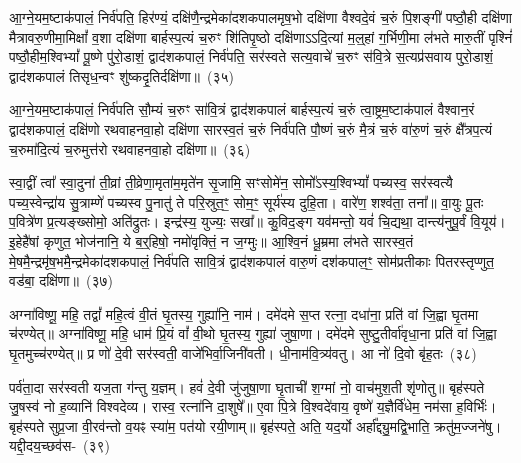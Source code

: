 {\anuvakamend[{वा॒र॒व॒न्तीयं॑ च॒त्वारि॑ च}]}%

आ॒ग्ने॒यम॒ष्टा\-क॑पालं॒ निर्व॑पति॒ हिर॑ण्यं॒ दक्षि॑णै॒न्द्रमेका॑\-दश\-कपालमृष॒भो दक्षि॑णा वैश्वदे॒वं च॒रुं पि॒शङ्गी॑ पष्ठौ॒ही दक्षि॑णा मैत्रावरु॒णीमा॒मिक्षां᳚ व॒शा दक्षि॑णा बार्\mbox{}हस्प॒त्यं च॒रुꣳ शि॑तिपृ॒ष्ठो दक्षि॑णा\-ऽ\-ऽदि॒त्यां म॒ल्॒\mbox{}हां ग॒र्भिणी॒मा ल॑भते मारु॒तीं पृश्निं॑ पष्ठौ॒हीम॒श्वि\-भ्यां᳚ पू॒ष्णे पु॑रो॒डाशं॒ द्वाद॑श\-कपालं॒ निर्व॑पति॒ सर॑स्वते सत्य॒वाचे॑ च॒रुꣳ स॑वि॒त्रे स॒त्यप्र॑सवाय पुरो॒डाशं॒ द्वाद॑श\-कपालं तिसृध॒न्वꣳ शु॑ष्कदृ॒तिर्दक्षि॑णा॥~(३५)

{\anuvakamend[{आ॒ग्ने॒यꣳ स॒प्तच॑त्वारिꣳशत्}]}%

आ॒ग्ने॒यम॒ष्टा\-क॑पालं॒ निर्व॑पति सौ॒म्यं च॒रुꣳ सा॑वि॒त्रं द्वाद॑श\-कपालं बार्\mbox{}हस्प॒त्यं च॒रुं त्वा॒ष्ट्रम॒ष्टाक॑पालं वैश्वान॒रं द्वाद॑श\-कपालं॒ दक्षि॑णो रथवाहनवा॒हो दक्षि॑णा सारस्व॒तं च॒रुं निर्व॑पति पौ॒ष्णं च॒रुं मै॒त्रं च॒रुं वा॑रु॒णं च॒रुं क्षै᳚त्रप॒त्यं च॒रुमा॑दि॒त्यं च॒रुमुत्त॑रो रथवाहनवा॒हो दक्षि॑णा॥~(३६)

{\anuvakamend[{आ॒ग्ने॒यं चतु॑स्त्रिꣳशत्}]}%

स्वा॒द्वीं त्वा᳚ स्वा॒दुना॑ ती॒व्रां ती॒व्रेणा॒मृता॑म॒मृते॑न सृ॒जामि॒ सꣳसोमे॑न॒ सोमो᳚\-ऽस्य॒श्वि\-भ्यां᳚ पच्यस्व॒ सर॑स्वत्यै पच्य॒स्वेन्द्रा॑य सु॒त्राम्णे॑ पच्यस्व पु॒नातु॑ ते परि॒स्रुत॒ꣳ॒ सोम॒ꣳ॒ सूर्य॑स्य दुहि॒ता। वारे॑ण॒ शश्व॑ता॒ तना᳚॥ वा॒युः पू॒तः प॒वित्रे॑ण प्र॒त्यङ्ख्सोमो॒ अति॑द्रुतः। इन्द्र॑स्य॒ युज्यः॒ सखा᳚॥ कु॒विद॒ङ्ग यव॑मन्तो॒ यवं॑ चि॒द्यथा॒ दान्त्य॑नुपू॒र्वं वि॒यूय॑। इ॒हेहै॑षां कृणुत॒ भोज॑नानि॒ ये ब॒र्॒\mbox{}हिषो॒ नमो॑वृक्तिं॒ न ज॒ग्मुः॥ आ॒श्वि॒नं धू॒म्रमा ल॑भते सारस्व॒तं मे॒षमै॒न्द्रमृ॑ष॒भमै॒न्द्रमेका॑\-दश\-कपालं॒ निर्व॑पति सावि॒त्रं द्वाद॑श\-कपालं वारु॒णं दश॑\-कपाल॒ꣳ॒ सोम॑प्रतीकाः पितरस्तृप्णुत॒ वड॑बा॒ दक्षि॑णा॥~(३७)

{\anuvakamend[{भोज॑नानि॒ षड्विꣳ॑शतिश्च}]}%

अग्ना॑विष्णू॒ महि॒ तद्वां᳚ महि॒त्वं वी॒तं घृ॒तस्य॒ गुह्या॑नि॒ नाम॑। दमे॑दमे स॒प्त रत्ना॒ दधा॑ना॒ प्रति॑ वां जि॒ह्वा घृ॒तमा च॑रण्येत्॥ अग्ना॑विष्णू॒ महि॒ धाम॑ प्रि॒यं वां᳚ वी॒थो घृ॒तस्य॒ गुह्या॑ जुषा॒णा। दमे॑दमे सुष्टु॒तीर्वा॑वृधा॒ना प्रति॑ वां जि॒ह्वा घृ॒तमुच्च॑रण्येत्॥ प्र णो॑ दे॒वी सर॑स्वती॒ वाजे॑भिर्वा॒जिनी॑वती। धी॒नाम॑वि॒त्र्य॑वतु। आ नो॑ दि॒वो बृ॑ह॒तः~(३८)

पर्व॑ता॒दा सर॑स्वती यज॒ता ग॑न्तु य॒ज्ञम्। हवं॑ दे॒वी जु॑जुषा॒णा घृ॒ताची॑ श॒ग्मां नो॒ वाच॑मुश॒ती शृ॑णोतु॥ बृह॑स्पते जु॒षस्व॑ नो ह॒व्यानि॑ विश्वदेव्य। रास्व॒ रत्ना॑नि दा॒शुषे᳚॥ ए॒वा पि॒त्रे वि॒श्वदे॑वाय॒ वृष्णे॑ य॒ज्ञैर्वि॑धेम॒ नम॑सा ह॒विर्भिः॑। बृह॑स्पते सुप्र॒जा वी॒रव॑न्तो व॒यꣴ स्या॑म॒ पत॑यो रयी॒णाम्॥ बृह॑स्पते॒ अति॒ यद॒र्यो अर्\mbox{}हा᳚द्द्यु॒मद्वि॒भाति॒ क्रतु॑म॒ज्जने॑षु। यद्दी॒दय॒च्छव॑स-~(३९)

